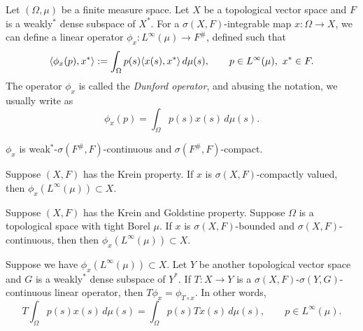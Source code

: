 \documentclass{../../small}
\begin{document}
\begin{prop}
Let $(\Omega,\mu)$ be a finite measure space.
Let $X$ be a topological vector space and $F$ is a weakly$^*$ dense subspace of $X^*$.
For a $\sigma(X,F)$-integrable map $x:\Omega\to X$, we can define a linear operator $\phi_x:L^\infty(\mu)\to F^\#$, defined such that
\[\langle\phi_x(p),x^*\rangle:=\int_\Omega p(s)\langle x(s),x^*\rangle\,d\mu(s),\qquad p\in L^\infty(\mu),\ x^*\in F.\]
The operator $\phi_x$ is called the \emph{Dunford operator}, and abusing the notation, we usually write as
\[\phi_x(p)=\int_\Omega p(s)x(s)\,d\mu(s).\]
\begin{parts}
\item $\phi_x$ is weak$^*$-$\sigma(F^\#,F)$-continuous and $\sigma(F^\#,F)$-compact.
\item Suppose $(X,F)$ has the Krein property.
If $x$ is $\sigma(X,F)$-compactly valued, then $\phi_x(L^\infty(\mu))\subset X$.
\item Suppose $(X,F)$ has the Krein and Goldstine property.
Suppose $\Omega$ is a topological space with tight Borel $\mu$.
If $x$ is $\sigma(X,F)$-bounded and $\sigma(X,F)$-continuous, then then $\phi_x(L^\infty(\mu))\subset X$.
\item Suppose we have $\phi_x(L^\infty(\mu))\subset X$. Let $Y$ be another topological vector space and $G$ is a weakly$^*$ dense subspace of $Y^*$. If $T:X\to Y$ is a $\sigma(X,F)$-$\sigma(Y,G)$-continuous linear operator, then $T\phi_x=\phi_{T\circ x}$. In other words,
\[T\int_\Omega p(s)x(s)\,d\mu(s)=\int_\Omega p(s)Tx(s)\,d\mu(s),\qquad p\in L^\infty(\mu).\]
\end{parts}
\end{prop}
\end{document}
